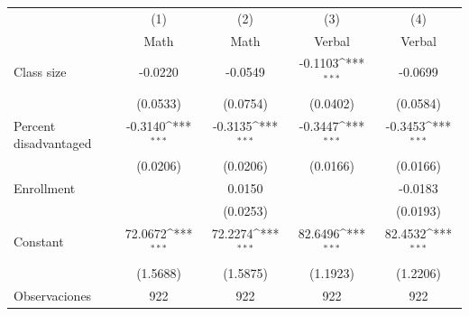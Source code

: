 {
\def\sym#1{\ifmmode^{#1}\else\(^{#1}\)\fi}
\begin{tabular}{l*{4}{c}}
\toprule
                    &\multicolumn{1}{c}{(1)}&\multicolumn{1}{c}{(2)}&\multicolumn{1}{c}{(3)}&\multicolumn{1}{c}{(4)}\\
                    &\multicolumn{1}{c}{Math}&\multicolumn{1}{c}{Math}&\multicolumn{1}{c}{Verbal}&\multicolumn{1}{c}{Verbal}\\
\midrule
Class size          &     -0.0220         &     -0.0549         &     -0.1103\sym{***}&     -0.0699         \\
                    &    (0.0533)         &    (0.0754)         &    (0.0402)         &    (0.0584)         \\
\addlinespace
Percent disadvantaged&     -0.3140\sym{***}&     -0.3135\sym{***}&     -0.3447\sym{***}&     -0.3453\sym{***}\\
                    &    (0.0206)         &    (0.0206)         &    (0.0166)         &    (0.0166)         \\
\addlinespace
Enrollment          &                     &      0.0150         &                     &     -0.0183         \\
                    &                     &    (0.0253)         &                     &    (0.0193)         \\
\addlinespace
Constant            &     72.0672\sym{***}&     72.2274\sym{***}&     82.6496\sym{***}&     82.4532\sym{***}\\
                    &    (1.5688)         &    (1.5875)         &    (1.1923)         &    (1.2206)         \\
\midrule
Observaciones       &         922         &         922         &         922         &         922         \\
\bottomrule
\end{tabular}
}
